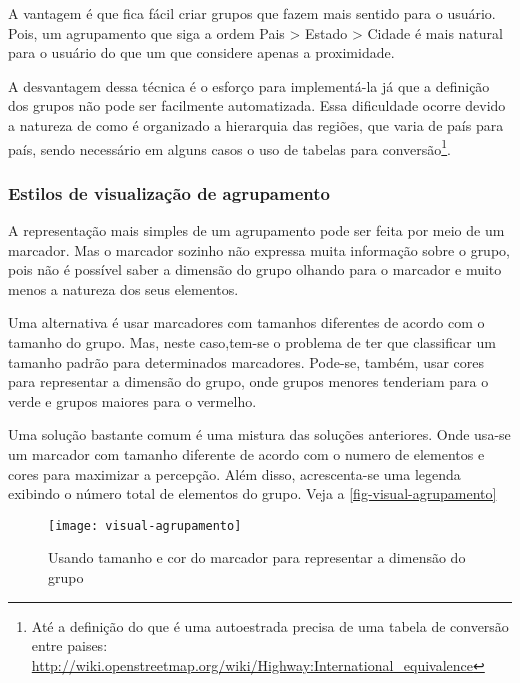 			A vantagem é que fica fácil criar grupos que fazem mais sentido para o usuário. Pois, um agrupamento que siga a ordem Pais > Estado > Cidade é mais natural para o usuário do que um que considere apenas a proximidade.
			
			A desvantagem dessa técnica é o esforço para implementá-la  \cite[182]{livroGoogleApiV3} já que a definição dos grupos não pode ser facilmente automatizada. Essa dificuldade ocorre devido a natureza de como é organizado a hierarquia das regiões, que varia de país para país, sendo necessário em alguns casos o uso de tabelas para conversão\footnote{Até a definição do que é uma autoestrada precisa de uma tabela de conversão entre paises: \url{http://wiki.openstreetmap.org/wiki/Highway:International_equivalence}}.
			
		\subsubsection{Estilos de visualização de agrupamento}
		A representação mais simples de um agrupamento pode ser feita por meio de um marcador. Mas o marcador sozinho não expressa muita informação sobre o grupo, pois não é possível saber a dimensão do grupo olhando para o marcador e muito menos a natureza dos seus elementos. 
		
		Uma alternativa é usar marcadores com tamanhos diferentes de acordo com o tamanho do grupo. Mas, neste caso,tem-se o problema de ter que classificar um tamanho padrão para determinados marcadores. Pode-se, também, usar cores para representar a dimensão do grupo, onde grupos menores tenderiam para o verde e grupos maiores para o vermelho.
		
		Uma solução bastante comum é uma mistura das soluções anteriores. Onde usa-se um marcador com tamanho diferente de acordo com o numero de elementos e cores para maximizar a percepção. Além disso, acrescenta-se uma legenda exibindo o número total de elementos do grupo. Veja a \autoref{fig-visual-agrupamento}
		
		
\begin{figure}[htb]
	\caption{\label{fig-visual-agrupamento}Usando tamanho e cor do marcador para representar a dimensão do grupo}
	\begin{center}
	    \texttt{[image: visual-agrupamento]}
	\end{center}
\end{figure}

